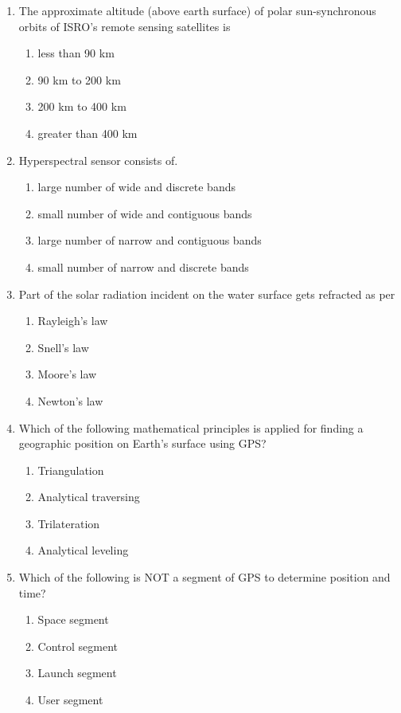 \documentclass[12pt]{article}
\begin{document}
\begin{enumerate}
\item The approximate altitude (above earth surface) of polar sun-synchronous orbits of
ISRO’s remote sensing satellites is

\begin{enumerate}
    \item  less than 90 km 
   \item 90 km to 200 km 
   \item 200 km to 400 km  
   \item  greater than 400 km  
\end{enumerate}

\item Hyperspectral sensor consists of.
\begin{enumerate}
    \item large number of wide and discrete bands 
   \item small number of wide and contiguous bands  
   \item large number of narrow and contiguous bands 
   \item small number of narrow and discrete bands 
\end{enumerate}

\item Part of the solar radiation incident on the water surface gets refracted as per

\begin{enumerate}
    \item Rayleigh’s law 
   \item Snell’s law 
   \item Moore’s law  
   \item Newton’s law 
\end{enumerate}

\item Which of the following mathematical principles is applied for finding a
geographic position on Earth’s surface using GPS?

\begin{enumerate}
   \item Triangulation 
   \item Analytical traversing  
   \item Trilateration 
   \item Analytical leveling
\end{enumerate}

\item Which of the following is NOT a segment of GPS to determine position and time?
\begin{enumerate}
    \item Space segment 
   \item Control segment 
   \item Launch segment 
   \item User segment
\end{enumerate}


\end{enumerate}
\end{document}
